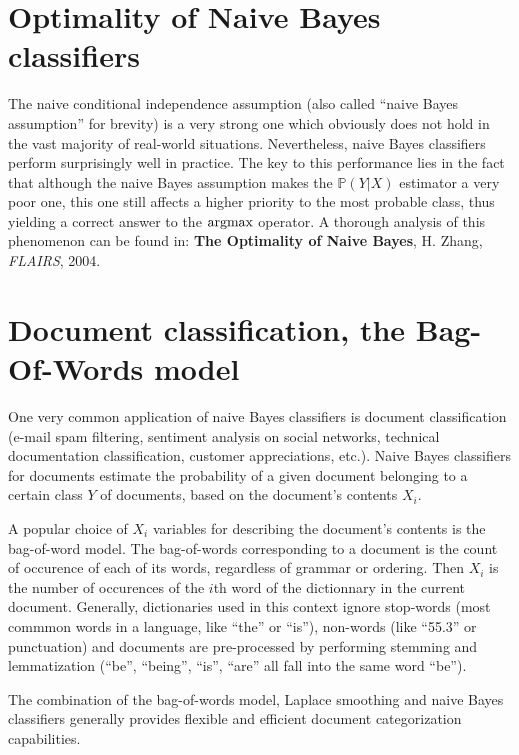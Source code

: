 \documentclass{article}
\newcommand{\argmax}{\operatornamewithlimits{argmax}}
\begin{document}
\section*{Optimality of Naive Bayes classifiers}

The naive conditional independence assumption (also called ``naive Bayes assumption'' for brevity) is a very strong one which obviously does not hold in the vast majority of real-world situations. Nevertheless, naive Bayes classifiers perform surprisingly well in practice. The key to this performance lies in the fact that although the naive Bayes assumption makes the $\mathbb{P}(Y|X)$ estimator a very poor one, this one still affects a higher priority to the most probable class, thus yielding a correct answer to the $\argmax$ operator. A thorough analysis of this phenomenon can be found in: \textbf{The Optimality of Naive Bayes}, H. Zhang, \textit{FLAIRS}, 2004.

\section*{Document classification, the Bag-Of-Words model}

One very common application of naive Bayes classifiers is document classification (e-mail spam filtering, sentiment analysis on social networks, technical documentation classification, customer appreciations, etc.). Naive Bayes classifiers for documents estimate the probability of a given document belonging to a certain class $Y$ of documents, based on the document's contents $X_i$.

A popular choice of $X_i$ variables for describing the document's contents is the bag-of-word model. The bag-of-words corresponding to a document is the count of occurence of each of its words, regardless of grammar or ordering. Then $X_i$ is the number of occurences of the $i$th word of the dictionnary in the current document. Generally, dictionaries used in this context ignore stop-words (most commmon words in a language, like ``the'' or ``is''), non-words (like ``55.3'' or punctuation) and documents are pre-processed by performing stemming and lemmatization (``be'', ``being'', ``is'', ``are'' all fall into the same word ``be'').

The combination of the bag-of-words model, Laplace smoothing and naive Bayes classifiers generally provides flexible and efficient document categorization capabilities.
\end{document}
